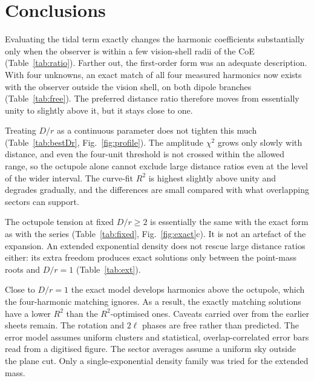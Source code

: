 \documentclass[10pt]{article}
\begin{document}
\section{Conclusions}
Evaluating the tidal term exactly changes the harmonic coefficients substantially only when the observer is within a few vision-shell radii of the CoE (Table~\ref{tab:ratio}). Farther out, the first-order form was an adequate description. With four unknowns, an exact match of all four measured harmonics now exists with the observer outside the vision shell, on both dipole branches (Table~\ref{tab:free}). The preferred distance ratio therefore moves from essentially unity to slightly above it, but it stays close to one.

Treating $D/r$ as a continuous parameter does not tighten this much (Table~\ref{tab:bestDr}, Fig.~\ref{fig:profile}). The amplitude $\chi^2$ grows only slowly with distance, and even the four-unit threshold is not crossed within the allowed range, so the octupole alone cannot exclude large distance ratios even at the level of the wider interval. The curve-fit $R^2$ is highest slightly above unity and degrades gradually, and the differences are small compared with what overlapping sectors can support.

The octupole tension at fixed $D/r\ge2$ is essentially the same with the exact form as with the series (Table~\ref{tab:fixed}, Fig.~\ref{fig:exact}c). It is not an artefact of the expansion. An extended exponential density does not rescue large distance ratios either: its extra freedom produces exact solutions only between the point-mass roots and $D/r=1$ (Table~\ref{tab:ext}).

Close to $D/r=1$ the exact model develops harmonics above the octupole, which the four-harmonic matching ignores. As a result, the exactly matching solutions have a lower $R^2$ than the $R^2$-optimised ones. Caveats carried over from the earlier sheets remain. The rotation and $2\ell$ phases are free rather than predicted. The error model assumes uniform clusters and statistical, overlap-correlated error bars read from a digitised figure. The sector averages assume a uniform sky outside the plane cut. Only a single-exponential density family was tried for the extended mass.
\end{document}
